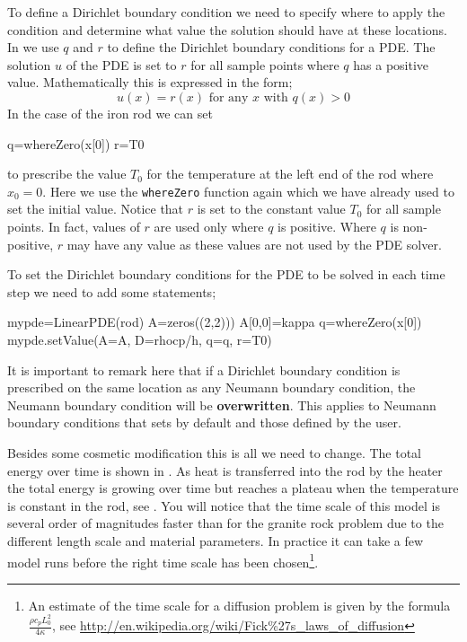 To define a Dirichlet boundary condition we need to specify where to apply the
condition and determine what value the
solution should have at these locations. In \esc we use $q$ and $r$ to define
the Dirichlet boundary conditions for a PDE. The solution $u$ of the PDE is set
to $r$ for all sample points where $q$ has a positive value.
Mathematically this is expressed in the form;
\begin{equation}
  u(x) = r(x) \mbox{ for any } x \mbox{ with } q(x) > 0
\end{equation} 
In the case of the iron rod we can set
\begin{python}
q=whereZero(x[0])
r=T0
\end{python}
to prescribe the value $T_{0}$ for the temperature at the left end of
the rod where $x_{0}=0$.
Here we use the \verb|whereZero| function again which we have already used to
set the initial value.
Notice that $r$ is set to the constant value $T_{0}$ for all sample
points. In fact, values of $r$ are used only where $q$ is positive. Where $q$
is non-positive, $r$ may have any value as these values are not used by the PDE
solver. 

To set the Dirichlet boundary conditions for the PDE to be solved in each time
step we need to add some statements;
\begin{python}
mypde=LinearPDE(rod)
A=zeros((2,2)))
A[0,0]=kappa
q=whereZero(x[0])
mypde.setValue(A=A, D=rhocp/h, q=q, r=T0)
\end{python}
It is important to remark here that if a Dirichlet boundary condition is
prescribed on the same location as any Neumann boundary condition, the Neumann
boundary condition will be \textbf{overwritten}. This applies to Neumann
boundary conditions that \esc sets by default and those defined by the user.

Besides some cosmetic modification this is all we need to change. The total
energy over time is shown in . As heat
is transferred into the rod by the heater the total energy is growing over time
but reaches a plateau when the temperature is constant in the rod, see
.
You will notice that the time scale of this model is several order of
magnitudes faster than for the granite rock problem due to the different length
scale and material parameters. 
In practice it can take a few model runs before the right time scale has been
chosen\footnote{An estimate of the
time scale for a diffusion problem is given by the formula $\frac{\rho
c_{p} L_{0}^2}{4 \kappa}$, see
\url{http://en.wikipedia.org/wiki/Fick\%27s_laws_of_diffusion}}.

